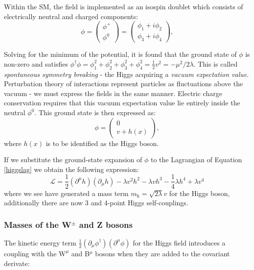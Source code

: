 Within the SM, the field is implemented as an isospin doublet which consists of electrically neutral and charged components:
\begin{equation}
\phi = \begin{pmatrix} \phi^{+} \\ \phi^{0} \end{pmatrix} = \begin{pmatrix} \phi_{1} + i\phi_{2} \\  \phi_{3} + i\phi_{4} \end{pmatrix},
\end{equation}

Solving for the minimum of the potential, it is found that the ground state of $\phi$ is non-zero and satisfies $\phi^{\dagger}\phi = \phi_{1}^{2} + \phi_{2}^{2} + \phi_{3}^{2}  + \phi_{4}^{2} = \frac{1}{2}v^{2} = - \mu^{2}/{2\lambda}$. This is called \textit{spontaneous symmetry breaking} - the Higgs acquiring a \textit{vacuum expectation value}. Perturbation theory of interactions represent particles as fluctuations above the vacuum - we must express the fields in the same manner. Electric charge conservation requires that this vacuum expectation value lie entirely inside the neutral $\phi^{0}$. This ground state is then expressed as: 
\begin{equation}
\phi = \begin{pmatrix} 0 \\  v + h(x) \end{pmatrix},
\end{equation}
where $h(x)$ is to be identified as the Higgs boson.

If we substitute the ground-state expansion of $\phi$ to the Lagrangian of Equation \ref{higgslag} we obtain the following expression:
\begin{equation}
\mathcal{L} = \frac{1}{2}(\partial^{\mu}h)(\partial_{\mu}h) - \lambda v^{2} h^{2} - \lambda vh^{3} - \frac{1}{4}\lambda h^{4} + \lambda v^{4}
\end{equation}
where we see have generated a mass term $m_{\mathrm{h}} = \sqrt{2 \lambda} v$ for the Higgs boson, additionally there are now 3 and 4-point Higgs self-couplings.

\subsubsection{Masses of the W$^{\pm}$ and Z bosons}

The kinetic energy term $\frac{1}{2} (\partial_{\mu}\phi^{\dagger})(\partial^{\mu}\phi)$ for the Higgs field introduces a coupling with the $\bm{\mathrm{W}}^{\mu}$ and B$^{\mu}$ bosons when they are added to the covariant derivate:

